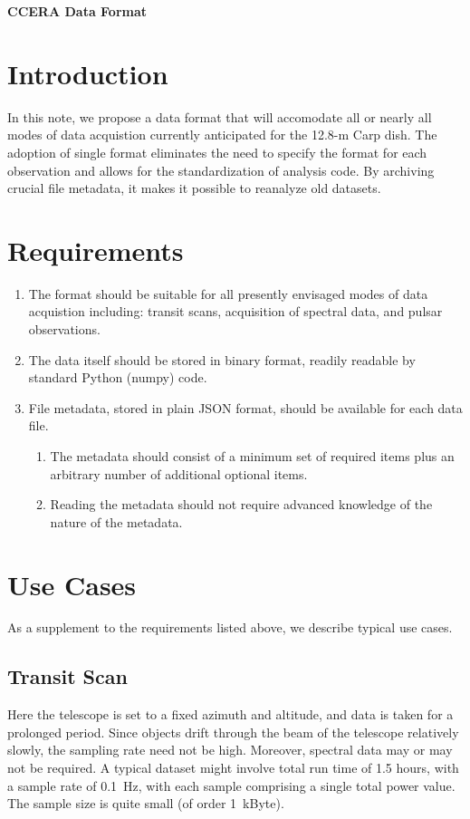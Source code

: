 \documentclass[12pt]{article}
\begin{document}
%
\bigskip
\bigskip
\bigskip
\begin{center}
{\Large \bf CCERA Data Format}
\end{center}

\section{Introduction}
In this note, we propose a data format that will accomodate all or nearly all modes of data acquistion currently anticipated for the 12.8-m Carp dish.    The adoption of single format eliminates the need to specify the format for each observation and allows for the standardization of analysis code.   By archiving crucial file metadata, it makes it possible to reanalyze old datasets.  

\section{Requirements}
\begin{enumerate}
\item The format should be suitable for all presently envisaged modes of data acquistion including: transit scans, acquisition of spectral data, and pulsar observations.  
\item The data itself should be stored in binary format, readily readable by standard Python (numpy) code. 
\item File metadata, stored in plain JSON format, should be available for each data file.  
\begin{enumerate}
 \item The metadata should consist of a minimum set of required items plus an arbitrary number of additional optional items.
 \item Reading the metadata should not require advanced knowledge of the nature of the metadata.
 \end{enumerate}
 \end{enumerate}
 
 \section{Use Cases}
 As a supplement to the requirements listed above, we describe typical use cases.
 \subsection{Transit Scan}
 Here the telescope is set to a fixed azimuth and altitude, and data is taken for a prolonged period.    Since objects drift through the beam of the telescope relatively slowly, the sampling rate need not be high.   Moreover, spectral data may or may not be required.    A typical dataset might involve total run time of 1.5 hours, with a sample rate of 0.1~Hz, with each sample comprising a single total power value.  The sample size is quite small (of order 1~kByte). 
 
\end{document}
